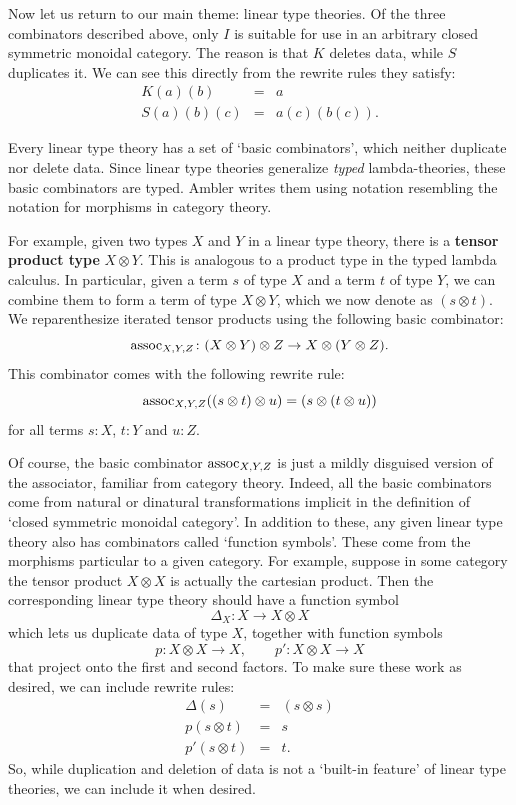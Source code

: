 \documentclass[12pt,twoside,openright]{report}
\newcommand{\maps}{\colon}
\newcommand{\tensor}{\otimes}
\newcommand{\assoc}{{\rm assoc}}
\begin{document}
Now let us return to our main theme: linear type theories.  Of the three combinators described above, only $I$ is suitable for use in an arbitrary closed symmetric monoidal category.  The reason is that $K$
deletes data, while $S$ duplicates it.  We can see this directly from the rewrite rules they satisfy:
\[
\begin{array}{ccl}
 K(a)(b) &=& a   \\
 S(a)(b)(c) &=& a(c)(b(c)).
\end{array}
\]

Every linear type theory has a set of `basic combinators', which neither duplicate nor delete data.  Since linear type theories generalize {\it typed} lambda-theories, these basic combinators are typed.  Ambler writes them using notation resembling the notation for morphisms in category theory.   

For example, given two types $X$ and $Y$ in a linear type theory, there is a {\bf tensor product type} $X \otimes Y$.  This is analogous to a product type in the typed lambda calculus. In particular, given a term $s$ of type $X$ and a term $t$ of type
$Y$, we can combine them to form a term of type $X \tensor Y$, which we now denote as $(s \tensor t)$.  We reparenthesize iterated tensor products using the following basic combinator:
\[   \assoc_{X,Y,Z}
      \maps (X\tensor Y)\tensor Z \to X \tensor (Y \tensor Z). \]
This combinator comes with the following rewrite rule:
\[   \assoc_{X,Y,Z}((s \tensor t) \tensor u) = (s \tensor (t \tensor u)) \]
for all terms $s:X$, $t:Y$ and $u:Z$.  

Of course, the basic combinator $\assoc_{X,Y,Z}$ is just a mildly disguised version of the associator, familiar from category theory. Indeed, all the basic combinators come from natural or dinatural transformations implicit in the definition of `closed symmetric monoidal category'.  In addition to these, any given linear type theory also has combinators called `function symbols'. These come from the morphisms particular to a given category. For example, suppose in some category the tensor product $X \otimes X$
is actually the cartesian product.  Then the corresponding linear type theory should have a function symbol
\[        \Delta_X \maps X \to X \tensor X \]
which lets us duplicate data of type $X$, together with function symbols
\[         p \maps X \tensor X \to X, \qquad p' \maps X \tensor X \to X \]
that project onto the first and second factors.  To make sure these work as desired, we can include rewrite rules:
\[ 
\begin{array}{ccc}
      \Delta(s) &=& (s \otimes s)  \\
      p(s \otimes t) &=& s \\
      p'(s \otimes t) &=& t  .
\end{array}
\]
So, while duplication and deletion of data is not a `built-in feature'
of linear type theories, we can include it when desired.  
\end{document}
